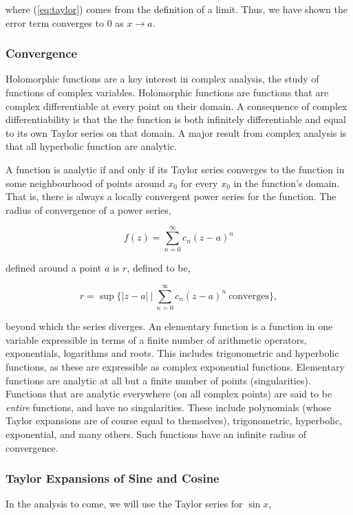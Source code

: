 \documentclass[11pt]{amsart}
\begin{document}
where (\ref{eq:taylor}) comes from the definition of a limit. Thus, we have shown the error term converges to 0 as $x \to a$.

\subsubsection{Convergence}

Holomorphic functions are a key interest in complex analysis, the study of functions of complex variables. Holomorphic functions are functions that are complex differentiable at every point on their domain. A consequence of complex differentiability is that the the function is both infinitely differentiable and equal to its own Taylor series on that domain. A major result from complex analysis is that all hyperbolic function are analytic.

A function is analytic if and only if its Taylor series converges to the function in some neighbourhood of points around $x_0$ for every $x_0$ in the function's domain. That is, there is always a locally convergent power series for the function. The radius of convergence of a power series,

$$f(z) = \sum_{n=0}^{\infty}c_n(z - a)^n$$

defined around a point $a$ is $r$, defined to be,

$$r = \sup\Bigg\{|z - a| \ \Bigg| \ \sum_{n=0}^{\infty}c_n(z - a)^n \ \text{converges} \Bigg\},$$

beyond which the series diverges. An elementary function is a function in one variable expressible in terms of a finite number of arithmetic operators, exponentials, logarithms and roots. This includes trigonometric and hyperbolic functions, as these are expressible as complex exponential functions. Elementary functions are analytic at all but a finite number of points (singularities). Functions that are analytic everywhere (on all complex points) are said to be \emph{entire} functions, and have no singularities. These include polynomials (whose Taylor expansions are of course equal to themselves), trigonometric, hyperbolic, exponential, and many others. Such functions have an infinite radius of convergence.

\subsubsection{Taylor Expansions of Sine and Cosine}

In the analysis to come, we will use the Taylor series for $\sin x$,
\end{document}
